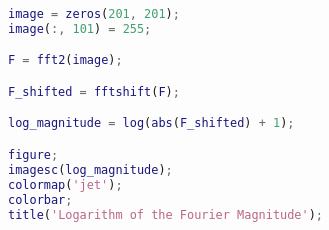 \documentclass{article}
\begin{document}
\begin{enumerate}
\begin{lstlisting}[language=matlab]
image = zeros(201, 201);
image(:, 101) = 255;

F = fft2(image);

F_shifted = fftshift(F);

log_magnitude = log(abs(F_shifted) + 1);

figure;
imagesc(log_magnitude);
colormap('jet');
colorbar;
title('Logarithm of the Fourier Magnitude');
\end{lstlisting}
\end{enumerate}
\end{document}
